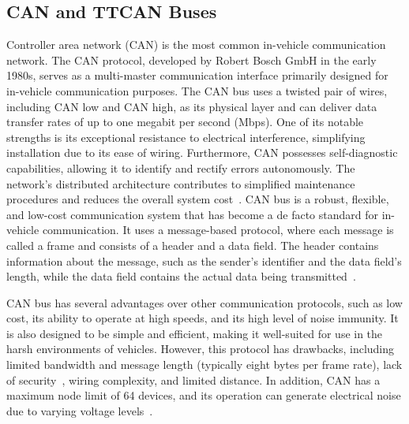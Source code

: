     \subsection{CAN and TTCAN Buses}
    
    Controller area network (CAN) is the most common in-vehicle communication network.
    The CAN protocol, developed by Robert Bosch GmbH in the early 1980s, serves as a multi-master communication interface primarily designed for in-vehicle communication purposes. %
    The CAN bus uses a twisted pair of wires, including CAN low and CAN high, as its physical layer and can deliver data transfer rates of up to one megabit per second (Mbps).
    One of its notable strengths is its exceptional resistance to electrical interference, simplifying installation due to its ease of wiring. Furthermore, CAN possesses self-diagnostic capabilities, allowing it to identify and rectify errors autonomously. The network's distributed architecture contributes to simplified maintenance procedures and reduces the overall system cost~\cite{bozdal2018survey}. CAN bus is a robust, flexible, and low-cost communication system that has become a de facto standard for in-vehicle communication.
    It uses a message-based protocol, where each message is called a frame and consists of a header and a data field. The header contains information about the message, such as the sender's identifier and the data field's length, while the data field contains the actual data being transmitted~\cite{CAN}.
    
    CAN bus has several advantages over other communication protocols, such as low cost, its ability to operate at high speeds, and its high level of noise immunity. It is also designed to be simple and efficient, making it well-suited for use in the harsh environments of vehicles. However, this protocol has drawbacks, including limited bandwidth and message length (typically eight bytes per frame rate), lack of security~\cite{bozdal2018survey}, wiring complexity, and limited distance. In addition, CAN has a maximum node limit of 64 devices, and its operation can generate electrical noise due to varying voltage levels~\cite{CANDis}.
    
    
    
